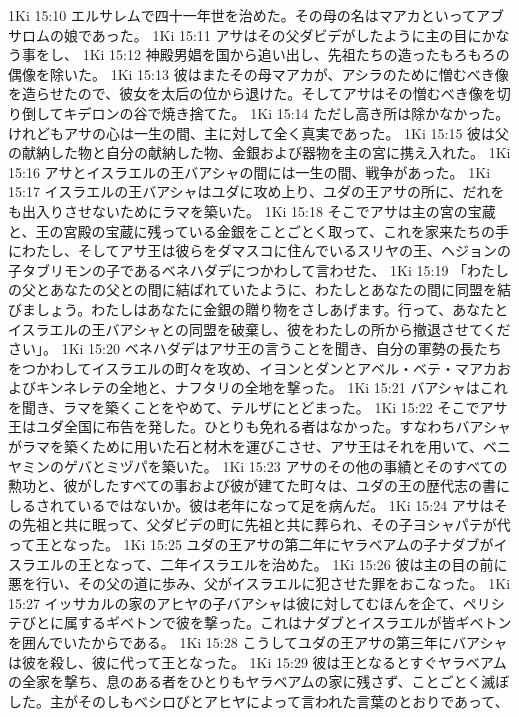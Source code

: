 1Ki 15:10  エルサレムで四十一年世を治めた。その母の名はマアカといってアブサロムの娘であった。
1Ki 15:11  アサはその父ダビデがしたように主の目にかなう事をし、
1Ki 15:12  神殿男娼を国から追い出し、先祖たちの造ったもろもろの偶像を除いた。
1Ki 15:13  彼はまたその母マアカが、アシラのために憎むべき像を造らせたので、彼女を太后の位から退けた。そしてアサはその憎むべき像を切り倒してキデロンの谷で焼き捨てた。
1Ki 15:14  ただし高き所は除かなかった。けれどもアサの心は一生の間、主に対して全く真実であった。
1Ki 15:15  彼は父の献納した物と自分の献納した物、金銀および器物を主の宮に携え入れた。
1Ki 15:16  アサとイスラエルの王バアシャの間には一生の間、戦争があった。
1Ki 15:17  イスラエルの王バアシャはユダに攻め上り、ユダの王アサの所に、だれをも出入りさせないためにラマを築いた。
1Ki 15:18  そこでアサは主の宮の宝蔵と、王の宮殿の宝蔵に残っている金銀をことごとく取って、これを家来たちの手にわたし、そしてアサ王は彼らをダマスコに住んでいるスリヤの王、ヘジョンの子タブリモンの子であるベネハダデにつかわして言わせた、
1Ki 15:19  「わたしの父とあなたの父との間に結ばれていたように、わたしとあなたの間に同盟を結びましょう。わたしはあなたに金銀の贈り物をさしあげます。行って、あなたとイスラエルの王バアシャとの同盟を破棄し、彼をわたしの所から撤退させてください」。
1Ki 15:20  ベネハダデはアサ王の言うことを聞き、自分の軍勢の長たちをつかわしてイスラエルの町々を攻め、イヨンとダンとアベル・ベテ・マアカおよびキンネレテの全地と、ナフタリの全地を撃った。
1Ki 15:21  バアシャはこれを聞き、ラマを築くことをやめて、テルザにとどまった。
1Ki 15:22  そこでアサ王はユダ全国に布告を発した。ひとりも免れる者はなかった。すなわちバアシャがラマを築くために用いた石と材木を運びこさせ、アサ王はそれを用いて、ベニヤミンのゲバとミヅパを築いた。
1Ki 15:23  アサのその他の事績とそのすべての勲功と、彼がしたすべての事および彼が建てた町々は、ユダの王の歴代志の書にしるされているではないか。彼は老年になって足を病んだ。
1Ki 15:24  アサはその先祖と共に眠って、父ダビデの町に先祖と共に葬られ、その子ヨシャパテが代って王となった。
1Ki 15:25  ユダの王アサの第二年にヤラベアムの子ナダブがイスラエルの王となって、二年イスラエルを治めた。
1Ki 15:26  彼は主の目の前に悪を行い、その父の道に歩み、父がイスラエルに犯させた罪をおこなった。
1Ki 15:27  イッサカルの家のアヒヤの子バアシャは彼に対してむほんを企て、ペリシテびとに属するギベトンで彼を撃った。これはナダブとイスラエルが皆ギベトンを囲んでいたからである。
1Ki 15:28  こうしてユダの王アサの第三年にバアシャは彼を殺し、彼に代って王となった。
1Ki 15:29  彼は王となるとすぐヤラベアムの全家を撃ち、息のある者をひとりもヤラベアムの家に残さず、ことごとく滅ぼした。主がそのしもべシロびとアヒヤによって言われた言葉のとおりであって、
